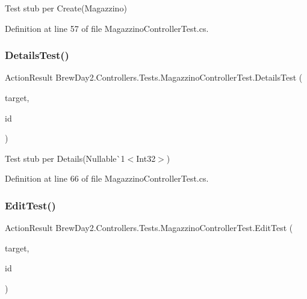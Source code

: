 Test stub per Create(\+Magazzino)



Definition at line 57 of file Magazzino\+Controller\+Test.\+cs.

\mbox{\label{class_brew_day2_1_1_controllers_1_1_tests_1_1_magazzino_controller_test_a0017684d3cc954acefdcb94b73639d80}} 
\subsubsection{\texorpdfstring{Details\+Test()}{DetailsTest()}}
{\footnotesize\ttfamily Action\+Result Brew\+Day2.\+Controllers.\+Tests.\+Magazzino\+Controller\+Test.\+Details\+Test (\begin{DoxyParamCaption}\item[{\mbox{[}\+Pex\+Assume\+Under\+Test\mbox{]} \mbox{\hyperlink{class_brew_day2_1_1_controllers_1_1_magazzino_controller}{Magazzino\+Controller}}}]{target,  }\item[{int?}]{id }\end{DoxyParamCaption})}



Test stub per Details(Nullable\`{}1$<$Int32$>$)



Definition at line 66 of file Magazzino\+Controller\+Test.\+cs.

\mbox{\label{class_brew_day2_1_1_controllers_1_1_tests_1_1_magazzino_controller_test_a33997af15e63b82b60dac06b390fed65}} 
\subsubsection{\texorpdfstring{Edit\+Test()}{EditTest()}}
{\footnotesize\ttfamily Action\+Result Brew\+Day2.\+Controllers.\+Tests.\+Magazzino\+Controller\+Test.\+Edit\+Test (\begin{DoxyParamCaption}\item[{\mbox{[}\+Pex\+Assume\+Under\+Test\mbox{]} \mbox{\hyperlink{class_brew_day2_1_1_controllers_1_1_magazzino_controller}{Magazzino\+Controller}}}]{target,  }\item[{int?}]{id }\end{DoxyParamCaption})}



